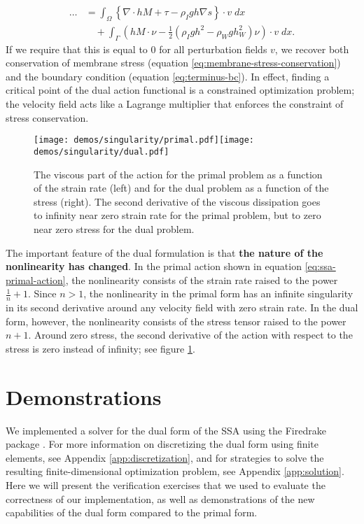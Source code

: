 \documentclass[review,oneside]{igs}
\begin{document}
\begin{align}
    \ldots & = \int_\Omega\left\{\nabla\cdot hM + \tau - \rho_Igh\nabla s\right\}\cdot v\;dx \nonumber\\
    & \quad + \int_\Gamma\left(hM\cdot\nu - \frac{1}{2}\left(\rho_Igh^2 - \rho_Wgh_W^2\right)\nu\right)\cdot v\;dx.
\end{align}
If we require that this is equal to 0 for all perturbation fields $v$, we recover both conservation of membrane stress (equation \eqref{eq:membrane-stress-conservation}) and the boundary condition (equation \eqref{eq:terminus-bc}).
In effect, finding a critical point of the dual action functional is a constrained optimization problem; the velocity field acts like a Lagrange multiplier that enforces the constraint of stress conservation.

\begin{figure}[h]
    \texttt{[image: demos/singularity/primal.pdf]}\texttt{[image: demos/singularity/dual.pdf]}
    \caption{The viscous part of the action for the primal problem as a function of the strain rate (left) and for the dual problem as a function of the stress (right).
    The second derivative of the viscous dissipation goes to infinity near zero strain rate for the primal problem, but to zero near zero stress for the dual problem.}
    \label{fig:primal-vs-dual}
\end{figure}

The important feature of the dual formulation is that \textbf{the nature of the nonlinearity has changed}.
In the primal action shown in equation \eqref{eq:ssa-primal-action}, the nonlinearity consists of the strain rate raised to the power $\frac{1}{n} + 1$.
Since $n > 1$, the nonlinearity in the primal form has an infinite singularity in its second derivative around any velocity field with zero strain rate.
In the dual form, however, the nonlinearity consists of the stress tensor raised to the power $n + 1$.
Around zero stress, the second derivative of the action with respect to the stress is zero instead of infinity; see figure \ref{fig:primal-vs-dual}.



\section{Demonstrations}

We implemented a solver for the dual form of the SSA using the Firedrake package \citep{FiredrakeUserManual}.
For more information on discretizing the dual form using finite elements, see Appendix \ref{app:discretization}, and for strategies to solve the resulting finite-dimensional optimization problem, see Appendix \ref{app:solution}.
Here we will present the verification exercises that we used to evaluate the correctness of our implementation, as well as demonstrations of the new capabilities of the dual form compared to the primal form.
\end{document}
